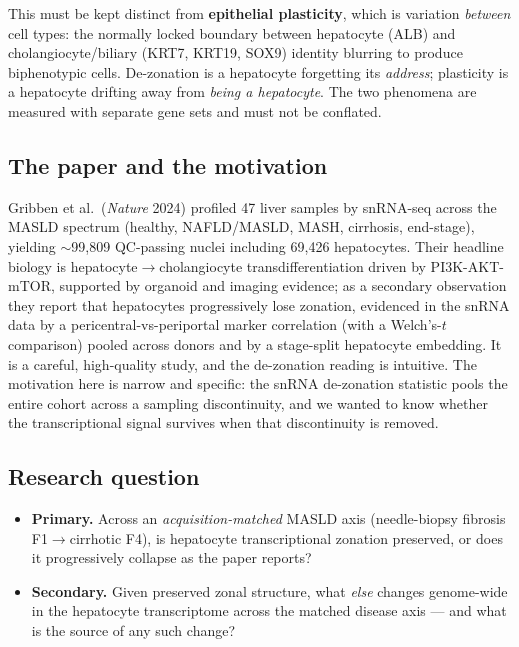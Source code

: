 \documentclass[11pt,a4paper]{article}
\begin{document}
This must be kept distinct from \textbf{epithelial plasticity}, which is variation \emph{between} cell types: the normally locked boundary between hepatocyte (ALB) and cholangiocyte/biliary (KRT7, KRT19, SOX9) identity blurring to produce biphenotypic cells. De-zonation is a hepatocyte forgetting its \emph{address}; plasticity is a hepatocyte drifting away from \emph{being a hepatocyte}. The two phenomena are measured with separate gene sets and must not be conflated.

\subsection{The paper and the motivation}

Gribben et al.\ (\emph{Nature} 2024) profiled 47 liver samples by snRNA-seq across the MASLD spectrum (healthy, NAFLD/MASLD, MASH, cirrhosis, end-stage), yielding $\sim$99{,}809 QC-passing nuclei including 69{,}426 hepatocytes. Their headline biology is hepatocyte$\to$cholangiocyte transdifferentiation driven by PI3K-AKT-mTOR, supported by organoid and imaging evidence; as a secondary observation they report that hepatocytes progressively lose zonation, evidenced in the snRNA data by a pericentral-vs-periportal marker correlation (with a Welch's-$t$ comparison) pooled across donors and by a stage-split hepatocyte embedding. It is a careful, high-quality study, and the de-zonation reading is intuitive. The motivation here is narrow and specific: the snRNA de-zonation statistic pools the entire cohort across a sampling discontinuity, and we wanted to know whether the transcriptional signal survives when that discontinuity is removed.

\subsection{Research question}

\begin{itemize}[leftmargin=1.4em]
  \item \textbf{Primary.} Across an \emph{acquisition-matched} MASLD axis (needle-biopsy fibrosis F1$\to$cirrhotic F4), is hepatocyte transcriptional zonation preserved, or does it progressively collapse as the paper reports?
  \item \textbf{Secondary.} Given preserved zonal structure, what \emph{else} changes genome-wide in the hepatocyte transcriptome across the matched disease axis --- and what is the source of any such change?
\end{itemize}
\end{document}

